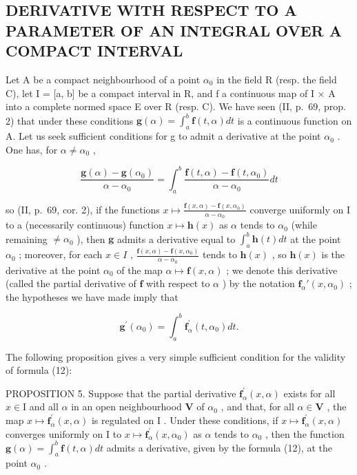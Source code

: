 \subsection{DERIVATIVE WITH RESPECT TO A PARAMETER OF AN INTEGRAL OVER A COMPACT INTERVAL}

Let A be a compact neighbourhood of a point \(\alpha_{0}\) in the field R (resp. the field C), let I = {[}a, b{]} be a compact interval in R, and f a continuous map of I × A into a complete normed space E over R (resp. C). We have seen (II, p.~69, prop. 2) that under these conditions \(\mathbf{g}(\alpha) = \int_{a}^{b} \mathbf{f}(t, \alpha) dt\) is a continuous function on A. Let us seek sufficient conditions for g to admit a derivative at the point \(\alpha_{0}\) . One has, for \(\alpha \neq \alpha_{0}\) ,

\[
\frac {\mathbf {g} (\alpha) - \mathbf {g} (\alpha_ {0})}{\alpha - \alpha_ {0}} = \int_ {a} ^ {b} \frac {\mathbf {f} (t , \alpha) - \mathbf {f} (t , \alpha_ {0})}{\alpha - \alpha_ {0}} d t
\]

so (II, p.~69, cor. 2), if the functions \(x \mapsto \frac{\mathbf{f}(x, \alpha) - \mathbf{f}(x, \alpha_0)}{\alpha - \alpha_0}\) converge uniformly on I to a (necessarily continuous) function \(x \mapsto \mathbf{h}(x)\) as \(\alpha\) tends to \(\alpha_0\) (while remaining \(\neq \alpha_0\) ), then \(\mathbf{g}\) admits a derivative equal to \(\int_{a}^{b} \mathbf{h}(t) dt\) at the point \(\alpha_0\) ; moreover, for each \(x \in I\) , \(\frac{\mathbf{f}(x, \alpha) - \mathbf{f}(x, \alpha_0)}{\alpha - \alpha_0}\) tends to \(\mathbf{h}(x)\) , so \(\mathbf{h}(x)\) is the derivative at the point \(\alpha_0\) of the map \(\alpha \mapsto \mathbf{f}(x, \alpha)\) ; we denote this derivative (called the partial derivative of \(\mathbf{f}\) with respect to \(\alpha\) ) by the notation \(\mathbf{f}_{\alpha}'(x, \alpha_0)\) ; the hypotheses we have made imply that

\[
\mathbf {g} ^ {\prime} (\alpha_ {0}) = \int_ {a} ^ {b} \mathbf {f} _ {\alpha} ^ {\prime} (t, \alpha_ {0}) d t.\tag{12}
\]

The following proposition gives a very simple sufficient condition for the validity of formula (12):

PROPOSITION 5. Suppose that the partial derivative \(\mathbf{f}_{\alpha}^{\prime}(x,\alpha)\) exists for all \(x\in \mathrm{I}\) and all \(\alpha\) in an open neighbourhood \(\mathbf{V}\) of \(\alpha_0\) , and that, for all \(\alpha \in \mathbf{V}\) , the map \(x\mapsto \mathbf{f}_{\alpha}^{\prime}(x,\alpha)\) is regulated on \(\mathrm{I}\) . Under these conditions, if \(x\mapsto \mathbf{f}_{\alpha}^{\prime}(x,\alpha)\) converges uniformly on \(\mathrm{I}\) to \(x\mapsto \mathbf{f}_{\alpha}^{\prime}(x,\alpha_0)\) as \(\alpha\) tends to \(\alpha_0\) , then the function \(\mathbf{g}(\alpha) = \int_{a}^{b}\mathbf{f}(t,\alpha)dt\) admits a derivative, given by the formula (12), at the point \(\alpha_0\) .

